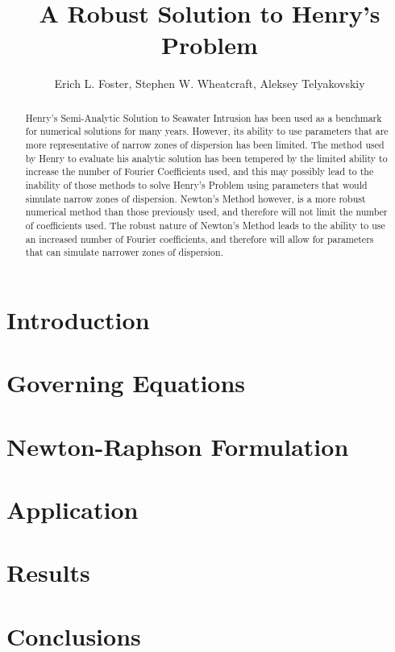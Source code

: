 \documentclass{article}
\title{A Robust Solution to Henry's Problem}
\author{Erich L. Foster, Stephen W. Wheatcraft, Aleksey Telyakovskiy}
\begin{document}
\maketitle

\begin{abstract}
Henry's Semi-Analytic Solution to Seawater Intrusion has been used as a 
benchmark for numerical solutions for many years. However, its ability to use 
parameters that are more representative of narrow zones of dispersion has been 
limited. The method used by Henry to evaluate his analytic solution has been 
tempered by the limited ability to increase the number of Fourier Coefficients 
used, and this may possibly lead to the inability of those methods to solve 
Henry's Problem using parameters that would simulate narrow zones of dispersion. 
Newton's Method however, is a more robust numerical method than those previously 
used, and therefore will not limit the number of coefficients used. The robust 
nature of Newton's Method leads to the ability to use an increased number of 
Fourier coefficients, and therefore will allow for parameters that can simulate 
narrower zones of dispersion.
\end{abstract}

%

\section{Introduction}


\section{Governing Equations}


%

\section{Newton-Raphson Formulation}


\section{Application}


\section{Results}


\section{Conclusions}




\end{document}
